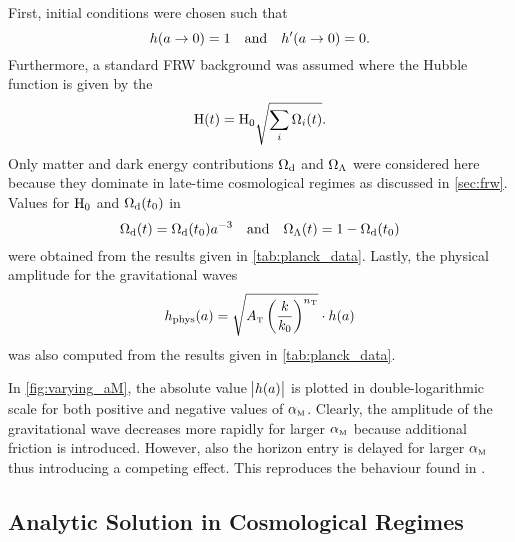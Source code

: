\documentclass[parskip=half]{scrreprt}
\begin{document}
First, initial conditions were chosen such that
\begin{equation}
	h(a \to 0) = 1 \quad \text{and} \quad h^\prime(a \to 0) = 0 \mathpunct{.}
\end{equation}
Furthermore, a standard FRW background was assumed where the Hubble function is given by the 
\begin{equation}
	\mathrm{H}(t) = \mathrm{H}_0 \sqrt{\sum_i\Omega_i(t)}
	\mathpunct{.}
\end{equation}
Only matter and dark energy contributions \(\Omega_{\mathrm{d}}\) and \(\Omega_\Lambda\) were considered here because they dominate in late-time cosmological regimes as discussed in \autoref{sec:frw}. Values for \(\mathrm{H}_0\) and \(\Omega_{\mathrm{d}}(t_0)\) in
\begin{equation}
	\Omega_{\mathrm{d}}(t) = \Omega_{\mathrm{d}}(t_0) a^{-3} \quad \text{and} \quad \Omega_\Lambda(t) = 1 - \Omega_{\mathrm{d}}(t_0)
\end{equation}
were obtained from the \cite{Planck}  results given in \autoref{tab:planck_data}.
Lastly, the physical amplitude for the gravitational waves
\begin{equation}
	h_\textnormal{phys}(a) = \sqrt{A_\tenspert\del{\frac{k}{k_0}}^{n_\tenspert}} \cdot h(a)
\end{equation}
was also computed from the \cite{Planck}  results given in \autoref{tab:planck_data}. 


In \autoref{fig:varying_aM}, the absolute value \(\abs{h(a)}\) is plotted in double-logarithmic scale  for both positive and negative values of \({\alpha_{\textnormal{\tiny{M}}}}\). Clearly, the amplitude of the gravitational wave decreases more rapidly for larger \({\alpha_{\textnormal{\tiny{M}}}}\) because additional friction is introduced. However, also the horizon entry is delayed for larger \({\alpha_{\textnormal{\tiny{M}}}}\) thus introducing a competing effect. This reproduces the behaviour found in \cite{Pettorino2014}. 


\subsection{Analytic Solution in Cosmological Regimes}
\end{document}
